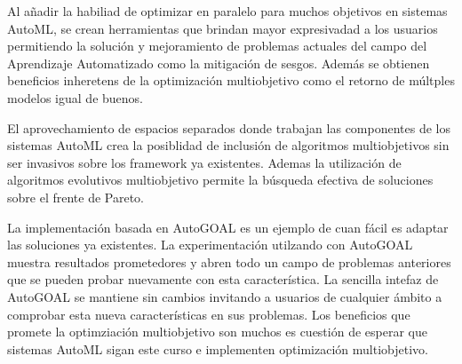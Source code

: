\begin{conclusions}
    Al a\~nadir la habiliad de optimizar en paralelo para muchos objetivos en sistemas AutoML, se crean herramientas que brindan mayor expresivadad a los usuarios permitiendo la soluci\'on y mejoramiento de problemas actuales del campo del Aprendizaje Automatizado como la mitigaci\'on de sesgos. Adem\'as se obtienen beneficios inheretens de la optimizaci\'on multiobjetivo como el retorno de m\'ultples modelos igual de buenos.

    El aprovechamiento de espacios separados donde trabajan las componentes de los sistemas AutoML crea la posiblidad de inclusi\'on de algoritmos multiobjetivos sin ser invasivos sobre los framework ya existentes. Ademas la utilizaci\'on de algoritmos evolutivos multiobjetivo permite la b\'usqueda efectiva de soluciones sobre el frente de Pareto.

    La implementaci\'on basada en AutoGOAL es un ejemplo de cuan f\'acil es adaptar las soluciones ya existentes. La experimentaci\'on utilzando con AutoGOAL muestra resultados prometedores y abren todo un campo de problemas anteriores que se pueden probar nuevamente con esta caracter\'istica. La sencilla intefaz de AutoGOAL se mantiene sin cambios invitando a usuarios de cualquier \'ambito a comprobar esta nueva caracter\'isticas en sus problemas.
Los beneficios que promete la optimziaci\'on multiobjetivo son muchos es cuesti\'on de esperar que sistemas AutoML sigan este curso e implementen optimizaci\'on multiobjetivo.
\end{conclusions}
